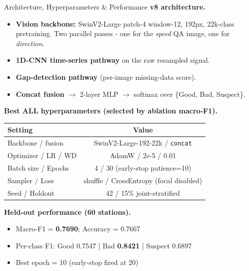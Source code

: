 \documentclass[aspectratio=169]{beamer}
\begin{document}
\begin{frame}{Architecture, Hyperparameters \& Performance}
  \textbf{v8 architecture.}
  \begin{itemize}
    \tiny
    \item \textbf{Vision backbone:} SwinV2-Large patch-4 window-12, 192px,
          22k-class pretraining. Two parallel passes - one for the
          \emph{speed} QA image, one for \emph{direction}.
    \item \textbf{1D-CNN time-series pathway} on the raw resampled signal.
    \item \textbf{Gap-detection pathway} (per-image missing-data score).
    \item \textbf{Concat fusion} $\rightarrow$ 2-layer MLP $\rightarrow$ softmax over
          \{Good, Bad, Suspect\}.
  \end{itemize}

  \textbf{Best ALL hyperparameters (selected by ablation macro-F1).}
  \begin{center}
  \tiny
  \begin{tabular}{lc}
    \toprule
    Setting & Value \\
    \midrule
    Backbone / fusion & SwinV2-Large-192-22k / \texttt{concat} \\
    Optimizer / LR / WD & AdamW / 2e-5 / 0.01 \\
    Batch size / Epochs & 4 / 30 (early-stop patience=10) \\
    Sampler / Loss & shuffle / CrossEntropy (focal disabled) \\
    Seed / Holdout & 42 / 15\% joint-stratified \\
    \bottomrule
  \end{tabular}
  \end{center}

  
\end{frame}



\begin{frame}
  \textbf{Held-out performance (60 stations).}
  \begin{itemize}

    \item Macro-F1 = \textbf{0.7690}; Accuracy = 0.7667
    \item Per-class F1: Good 0.7547 \;|\; Bad \textbf{0.8421} \;|\; Suspect 0.6897
    \item Best epoch = 10 (early-stop fired at 20)
  \end{itemize}

\end{frame}
\end{document}
